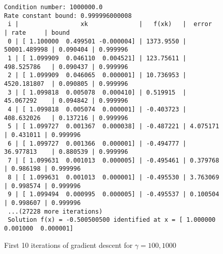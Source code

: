 \begin{solution}
\begin{figure}[h]
\begin{verbatim}
Condition number: 1000000.0
Rate constant bound: 0.999996000008
 i |                 xk              |   f(xk)   |  error       | rate     | bound
 0 | [ 1.100000  0.499501 -0.000004] | 1373.9550 | 50001.489998 | 0.090404 | 0.999996
 1 | [ 1.099909  0.046110  0.004521] | 123.75611 | 498.525786   | 0.090437 | 0.999996
 2 | [ 1.099909  0.046065  0.000001] | 10.736953 | 4520.181807  | 0.090805 | 0.999996
 3 | [ 1.099818  0.005078  0.000410] | 0.519915  | 45.067292    | 0.094842 | 0.999996
 4 | [ 1.099818  0.005074  0.000001] | -0.403723 | 408.632026   | 0.137216 | 0.999996
 5 | [ 1.099727  0.001367  0.000038] | -0.487221 | 4.075171     | 0.431011 | 0.999996
 6 | [ 1.099727  0.001366  0.000001] | -0.494777 | 36.977813    | 0.880539 | 0.999996
 7 | [ 1.099631  0.001013  0.000005] | -0.495461 | 0.379768     | 0.986198 | 0.999996
 8 | [ 1.099631  0.001013  0.000001] | -0.495530 | 3.763069     | 0.998574 | 0.999996
 9 | [ 1.099494  0.000995  0.000005] | -0.495537 | 0.100504     | 0.998607 | 0.999996
 ...(27228 more iterations)
 Solution f(x) = -0.500500500 identified at x = [ 1.000000  0.001000  0.000001]
        \end{verbatim}
        \caption{First 10 iterations of gradient descent for $\gamma = 100, 1000$}
        \label{fig:gamma_100_1000}
    \end{figure}
    \ \\
\end{solution}
